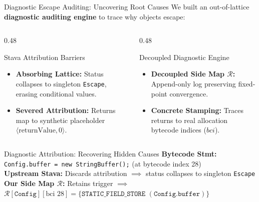 \documentclass[11pt]{beamer}
\begin{document}
\begin{frame}{Diagnostic Escape Auditing: Uncovering Root Causes}
  \footnotesize We built an out-of-lattice \textbf{diagnostic auditing engine} to trace why objects escape:

  \begin{columns}[T]
    \begin{column}{0.48\textwidth}
      \begin{block}{Stava Attribution Barriers}
        \scriptsize
        \begin{itemize}\setlength{\itemsep}{1pt}
          \item \textbf{Absorbing Lattice:} Status collapses to singleton \texttt{Escape}, erasing conditional values.
          \item \textbf{Severed Attribution:} Returns map to synthetic placeholder $\langle\text{returnValue}, 0\rangle$.
        \end{itemize}
      \end{block}
    \end{column}

    \begin{column}{0.48\textwidth}
      \begin{block}{Decoupled Diagnostic Engine}
        \scriptsize
        \begin{itemize}\setlength{\itemsep}{1pt}
          \item \textbf{Decoupled Side Map $\mathcal{R}$:} Append-only log preserving fixed-point convergence.
          \item \textbf{Concrete Stamping:} Traces returns to real allocation bytecode indices ($bci$).
        \end{itemize}
      \end{block}
    \end{column}
  \end{columns}

  \begin{exampleblock}{Diagnostic Attribution: Recovering Hidden Causes}
    \scriptsize
    \textbf{Bytecode Stmt:} \texttt{Config.buffer = new StringBuffer();} (at bytecode index 28)\\
    \textbf{Upstream Stava:} Discards attribution $\implies$ status collapses to singleton \texttt{Escape}\\
    \textbf{Our Side Map $\mathcal{R}$:} Retains trigger $\implies$ $\mathcal{R}[\texttt{Config}][\text{bci } 28] = \{\texttt{STATIC\_FIELD\_STORE } (\texttt{Config.buffer})\}$
  \end{exampleblock}
\end{frame}
\end{document}
